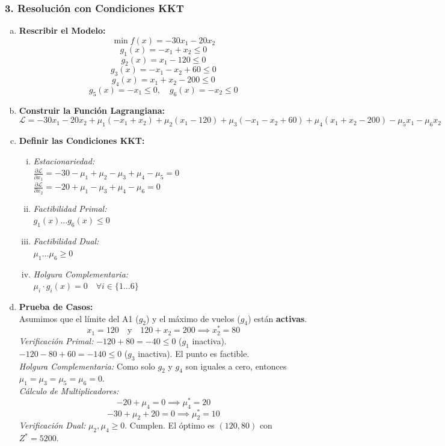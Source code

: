 \documentclass{article}
\begin{document}
	\subsubsection*{3. Resolución con Condiciones KKT}
	\begin{enumerate}[a)]
		\item \textbf{Rescribir el Modelo:}\\
		$$ \min f(x) = -30x_1 - 20x_2 $$
		$$ g_1(x) = -x_1 + x_2 \leq 0 $$
		$$ g_2(x) = x_1 - 120 \leq 0 $$
		$$ g_3(x) = -x_1 - x_2 + 60 \leq 0 $$
		$$ g_4(x) = x_1 + x_2 - 200 \leq 0 $$
		$$ g_5(x) = -x_1 \leq 0, \quad g_6(x) = -x_2 \leq 0 $$
		
		\item \textbf{Construir la Función Lagrangiana:}\\
		$$ \mathcal{L} = -30x_1 - 20x_2 + \mu_1(-x_1+x_2) + \mu_2(x_1-120) + \mu_3(-x_1-x_2+60) + \mu_4(x_1+x_2-200) - \mu_5 x_1 - \mu_6 x_2 $$
		
		\item \textbf{Definir las Condiciones KKT:}\\
		\begin{enumerate}[i)]
			\item \textit{Estacionariedad:}\\
			$\frac{\partial \mathcal{L}}{\partial x_1} = -30 - \mu_1 + \mu_2 - \mu_3 + \mu_4 - \mu_5 = 0$\\
			$\frac{\partial \mathcal{L}}{\partial x_2} = -20 + \mu_1 - \mu_3 + \mu_4 - \mu_6 = 0$
			\item \textit{Factibilidad Primal:}\\
			$g_1(x) \dots g_6(x) \leq 0$
			\item \textit{Factibilidad Dual:}\\
			$\mu_1 \dots \mu_6 \geq 0$
			\item \textit{Holgura Complementaria:}\\
			$\mu_i \cdot g_i(x) = 0 \quad \forall i \in \{1 \dots 6\}$
		\end{enumerate}
		
		\item \textbf{Prueba de Casos:}\\
		Asumimos que el límite del A1 ($g_2$) y el máximo de vuelos ($g_4$) están \textbf{activas}.
		$$ x_1 = 120 \quad \text{y} \quad 120 + x_2 = 200 \implies x_2^* = 80 $$
		\textit{Verificación Primal:} $-120 + 80 = -40 \leq 0$ ($g_1$ inactiva). $-120 - 80 + 60 = -140 \leq 0$ ($g_3$ inactiva). El punto es factible.\\
		\textit{Holgura Complementaria:} Como solo $g_2$ y $g_4$ son iguales a cero, entonces $\mu_1 = \mu_3 = \mu_5 = \mu_6 = 0$.\\
		\textit{Cálculo de Multiplicadores:}
		$$ -20 + \mu_4 = 0 \implies \mu_4^* = 20 $$
		$$ -30 + \mu_2 + 20 = 0 \implies \mu_2^* = 10 $$
		\textit{Verificación Dual:} $\mu_2, \mu_4 \geq 0$. Cumplen. El óptimo es $(120, 80)$ con $Z^* = 5200$.
	\end{enumerate}
	
\end{document}

